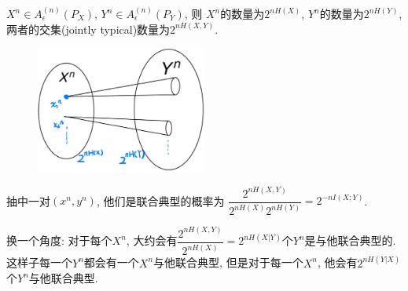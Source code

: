 \begin{proposition}
$X^n\in A_{\epsilon}^{(n)}(P_X)$, $Y^n\in A_{\epsilon}^{(n)}(P_Y)$, 则 $X^n$的数量为$2^{nH(X)}$, $Y^n$的数量为$2^{nH(Y)}$, 两者的交集(jointly typical)数量为$2^{nH(X,Y)}$.
\begin{figure}[htbp]
    \centering
    \includegraphics[width=0.5\textwidth]{./figures/chapter4/joint_typical_set.png}
\end{figure}

抽中一对$(x^n,y^n)$, 他们是联合典型的概率为 $\dfrac{2^{nH(X,Y)}}{2^{nH(X)}2^{nH(Y)}}=2^{-nI(X;Y)}$.

换一个角度: 对于每个$X^n$, 大约会有$\dfrac{2^{nH(X,Y)}}{2^{nH(X)}}=2^{nH(X|Y)}$个$Y^n$是与他联合典型的. 这样子每一个$Y^n$都会有一个$X^n$与他联合典型, 但是对于每一个$X^n$, 他会有$2^{nH(Y|X)}$个$Y^n$与他联合典型.
\end{proposition}